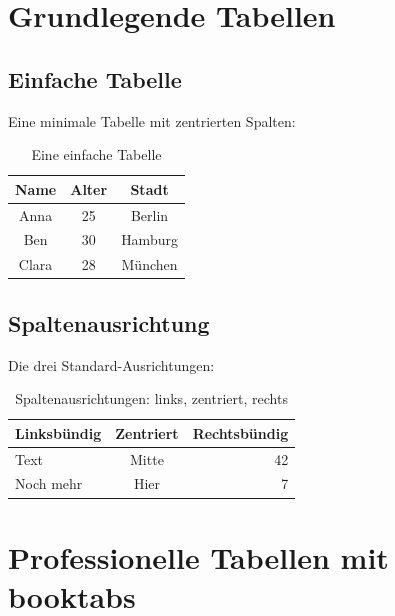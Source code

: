 
\chapter{Grundlegende Tabellen}
\label{sec:grundlagen}

\section{Einfache Tabelle}

Eine minimale Tabelle mit zentrierten Spalten:

\begin{table}[htbp]
    \centering
    \caption{Eine einfache Tabelle}
    \label{tab:einfach}
    \begin{tabular}{ccc}
        \hline
        Name & Alter & Stadt \\
        \hline
        Anna & 25 & Berlin \\
        Ben & 30 & Hamburg \\
        Clara & 28 & München \\
        \hline
    \end{tabular}
\end{table}

\section{Spaltenausrichtung}

Die drei Standard-Ausrichtungen:

\begin{table}[htbp]
    \centering
    \caption{Spaltenausrichtungen: links, zentriert, rechts}
    \label{tab:ausrichtung}
    \begin{tabular}{lcr}
        \hline
        Linksbündig & Zentriert & Rechtsbündig \\
        \hline
        Text & Mitte & 42 \\
        Noch mehr & Hier & 7 \\
        \hline
    \end{tabular}
\end{table}

\chapter{Professionelle Tabellen mit booktabs}
\label{sec:booktabs}

